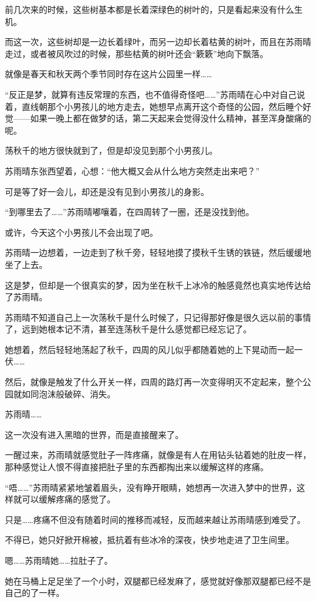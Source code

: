 前几次来的时候，这些树基本都是长着深绿色的树叶的，只是看起来没有什么生机。

而这一次，这些树却是一边长着绿叶，而另一边却长着枯黄的树叶，而且在苏雨晴走过，或者被风吹过的时候，那些枯黄的树叶还会“簌簌”地向下飘落。

就像是春天和秋天两个季节同时存在这片公园里一样……

“反正是梦，就算有违反常理的东西，也不值得奇怪吧……”苏雨晴在心中对自己说着，直线朝那个小男孩儿的地方走去，她想早点离开这个奇怪的公园，然后睡个好觉——如果一晚上都在做梦的话，第二天起来会觉得没什么精神，甚至浑身酸痛的呢。

荡秋千的地方很快就到了，但是却没见到那个小男孩儿。

苏雨晴东张西望着，心想：“他大概又会从什么地方突然走出来吧？”

可是等了好一会儿，却还是没有见到小男孩儿的身影。

“到哪里去了……”苏雨晴嘟嚷着，在四周转了一圈，还是没找到他。

或许，今天这个小男孩儿不会出现了吧。

苏雨晴一边想着，一边走到了秋千旁，轻轻地摸了摸秋千生锈的铁链，然后缓缓地坐了上去。

这是梦，但却是一个很真实的梦，因为坐在秋千上冰冷的触感竟然也真实地传达给了苏雨晴。

苏雨晴不知道自己上一次荡秋千是什么时候了，只记得那好像是很久远以前的事情了，远到她根本记不清，甚至连荡秋千是什么感觉都已经忘记了。

她想着，然后轻轻地荡起了秋千，四周的风儿似乎都随着她的上下晃动而一起一伏……

然后，就像是触发了什么开关一样，四周的路灯再一次变得明灭不定起来，整个公园就如同泡沫般破碎、消失。

苏雨晴……

这一次没有进入黑暗的世界，而是直接醒来了。

一醒过来，苏雨晴就感觉肚子一阵疼痛，就像是有人在用钻头钻着她的肚皮一样，那种感觉让人恨不得直接把肚子里的东西都掏出来以缓解这样的疼痛。

“唔……”苏雨晴紧紧地皱着眉头，没有睁开眼睛，她想再一次进入梦中的世界，这样就可以缓解疼痛的感觉了。

只是……疼痛不但没有随着时间的推移而减轻，反而越来越让苏雨晴感到难受了。

不得已，她只好掀开棉被，抵抗着有些冰冷的深夜，快步地走进了卫生间里。

嗯……苏雨晴她……拉肚子了。

她在马桶上足足坐了一个小时，双腿都已经发麻了，感觉就好像那双腿都已经不是自己的了一样。

